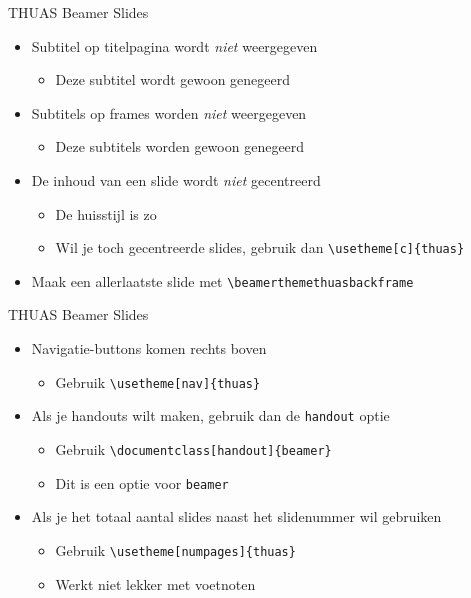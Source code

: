 \documentclass[fleqn,aspectratio=169,dutch]{beamer}
\begin{document}
\begin{frame}[fragile]{THUAS Beamer Slides}
\begin{itemize}
\item Subtitel op titelpagina wordt \emph{niet} weergegeven
\begin{itemize}
\item Deze subtitel wordt gewoon genegeerd
\end{itemize}
\item Subtitels op frames worden \emph{niet} weergegeven
\begin{itemize}
\item Deze subtitels worden gewoon genegeerd
\end{itemize}
\item De inhoud van een slide wordt \emph{niet} gecentreerd
\begin{itemize}
\item De huisstijl is zo
\item Wil je toch gecentreerde slides, gebruik dan \lstinline|\usetheme[c]{thuas}|
\end{itemize}
\item Maak een allerlaatste slide met \lstinline|\beamerthemethuasbackframe|
\end{itemize}
\end{frame}

\begin{frame}[fragile]{THUAS Beamer Slides}
\begin{itemize}
\item Navigatie-buttons komen rechts boven
\begin{itemize}
\item Gebruik \lstinline|\usetheme[nav]{thuas}|
\end{itemize}
\item Als je handouts wilt maken, gebruik dan de \lstinline|handout| optie
\begin{itemize}
\item Gebruik \lstinline|\documentclass[handout]{beamer}|
\item Dit is een optie voor \lstinline|beamer|
\end{itemize}
\item Als je het totaal aantal slides naast het slidenummer wil gebruiken
\begin{itemize}
\item Gebruik \lstinline|\usetheme[numpages]{thuas}|
\item Werkt niet lekker met voetnoten
\end{itemize}
\end{itemize}
\end{frame}
\end{document}
